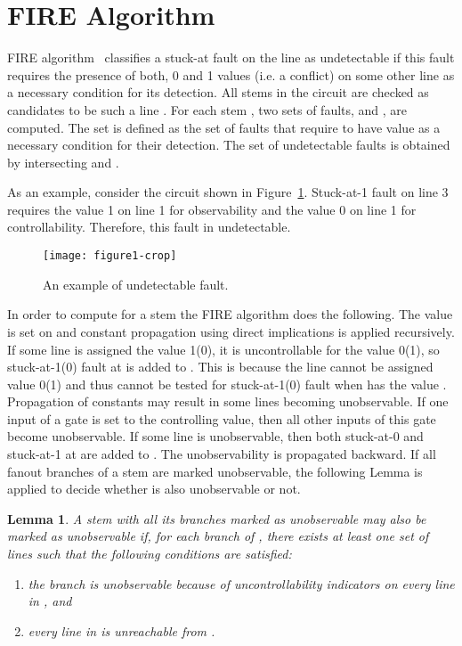\documentclass[conference]{IEEEtran} \usepackage{times}
\newtheorem{lemma}{Lemma}
\begin{document}
\section{FIRE Algorithm}
\label{prelim}


FIRE algorithm~\cite{IyA96} classifies a stuck-at fault on the line  as
undetectable if this fault requires the presence of both, 0 and 1
values (i.e. a conflict) on some other line  as a necessary
condition for its detection. All stems in the circuit are checked as
candidates to be such a line .  For each stem , two sets of
faults,  and , are computed.  The set  is defined
as the set of faults that require  to have value  as
a necessary condition for their detection.  The set of undetectable
faults is obtained by intersecting  and .

As an example, consider the circuit shown in
Figure~\ref{ex}. Stuck-at-1 fault on line 3 requires the value 1 on
line 1 for observability and the value 0 on line 1 for
controllability. Therefore, this fault in undetectable.

\begin{figure}[t!]
\begin{center}
\texttt{[image: figure1-crop]}
\caption{An example of undetectable fault.}\label{ex}
\end{center}
\end{figure}

In order to compute  for a stem  the FIRE algorithm does the
following.  The value  is set on  and constant
propagation using direct implications is applied recursively.  If some
line  is assigned the value 1(0), it is uncontrollable for the
value 0(1), so stuck-at-1(0) fault at  is added to . This is
because the line  cannot be assigned value 0(1) and thus cannot be
tested for stuck-at-1(0) fault when  has the value .
Propagation of constants may result in some lines becoming
unobservable.  If one input of a gate is set to the controlling value,
then all other inputs of this gate become unobservable. If some line
 is unobservable, then both stuck-at-0 and stuck-at-1 at  are
added to . The unobservability is propagated backward.  If all
fanout branches of a stem  are marked unobservable, the following
Lemma is applied to decide whether  is also unobservable or not.

\begin{lemma} \label{l1} \cite{IyA96} 
A stem  with all its branches marked as unobservable may also
be marked as unobservable if, for each branch  of , there
exists at least one set of lines  such that the following
conditions are satisfied:
\begin{enumerate}
\item the branch  is unobservable because of uncontrollability 
indicators on every line in , and
\item every line in   is unreachable from .
\end{enumerate}
\end{lemma}
\end{document}
